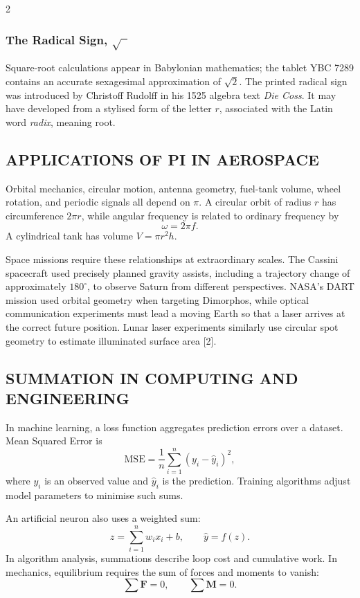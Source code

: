 \begin{multicols}{2}
  \subsubsection*{The Radical Sign, $\sqrt{\phantom{x}}$}
  Square-root calculations appear in Babylonian mathematics; the tablet YBC 7289 contains an accurate sexagesimal approximation of $\sqrt{2}$. The printed radical sign was introduced by Christoff Rudolff in his 1525 algebra text \textit{Die Coss}. It may have developed from a stylised form of the letter $r$, associated with the Latin word \textit{radix}, meaning root.

  \subsection*{\centering\uppercase{Applications of Pi in Aerospace}}
  Orbital mechanics, circular motion, antenna geometry, fuel-tank volume, wheel rotation, and periodic signals all depend on $\pi$. A circular orbit of radius $r$ has circumference $2\pi r$, while angular frequency is related to ordinary frequency by
  \[
    \omega=2\pi f.
  \]
  A cylindrical tank has volume $V=\pi r^2h$.

  \noindent
  Space missions require these relationships at extraordinary scales. The Cassini spacecraft used precisely planned gravity assists, including a trajectory change of approximately $180^\circ$, to observe Saturn from different perspectives. NASA's DART mission used orbital geometry when targeting Dimorphos, while optical communication experiments must lead a moving Earth so that a laser arrives at the correct future position. Lunar laser experiments similarly use circular spot geometry to estimate illuminated surface area [2].

  \subsection*{\centering\uppercase{Summation in Computing and Engineering}}
  In machine learning, a loss function aggregates prediction errors over a dataset. Mean Squared Error is
  \[
    \mathrm{MSE}=\frac{1}{n}\sum_{i=1}^{n}(y_i-\hat{y}_i)^2,
  \]
  where $y_i$ is an observed value and $\hat{y}_i$ is the prediction. Training algorithms adjust model parameters to minimise such sums.

  \noindent
  An artificial neuron also uses a weighted sum:
  \[
    z=\sum_{i=1}^{n}w_ix_i+b, \qquad \hat{y}=f(z).
  \]
  In algorithm analysis, summations describe loop cost and cumulative work. In mechanics, equilibrium requires the sum of forces and moments to vanish:
  \[
    \sum \mathbf{F}=0, \qquad \sum \mathbf{M}=0.
  \]


\end{multicols}
